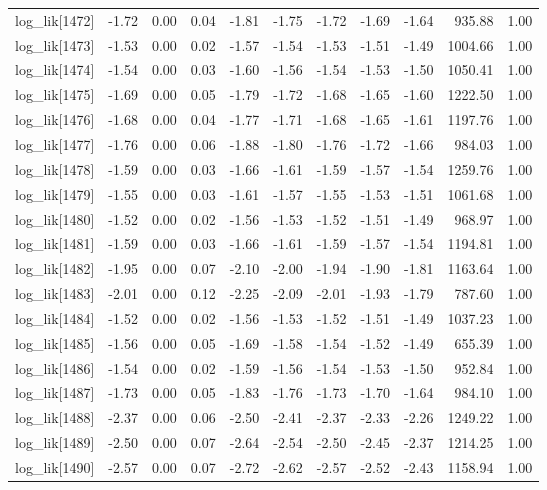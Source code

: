 \begin{table}[ht]
\begin{tabular}{rrrrrrrrrrr}
  log\_lik[1472] & -1.72 & 0.00 & 0.04 & -1.81 & -1.75 & -1.72 & -1.69 & -1.64 & 935.88 & 1.00 \\ 
  log\_lik[1473] & -1.53 & 0.00 & 0.02 & -1.57 & -1.54 & -1.53 & -1.51 & -1.49 & 1004.66 & 1.00 \\ 
  log\_lik[1474] & -1.54 & 0.00 & 0.03 & -1.60 & -1.56 & -1.54 & -1.53 & -1.50 & 1050.41 & 1.00 \\ 
  log\_lik[1475] & -1.69 & 0.00 & 0.05 & -1.79 & -1.72 & -1.68 & -1.65 & -1.60 & 1222.50 & 1.00 \\ 
  log\_lik[1476] & -1.68 & 0.00 & 0.04 & -1.77 & -1.71 & -1.68 & -1.65 & -1.61 & 1197.76 & 1.00 \\ 
  log\_lik[1477] & -1.76 & 0.00 & 0.06 & -1.88 & -1.80 & -1.76 & -1.72 & -1.66 & 984.03 & 1.00 \\ 
  log\_lik[1478] & -1.59 & 0.00 & 0.03 & -1.66 & -1.61 & -1.59 & -1.57 & -1.54 & 1259.76 & 1.00 \\ 
  log\_lik[1479] & -1.55 & 0.00 & 0.03 & -1.61 & -1.57 & -1.55 & -1.53 & -1.51 & 1061.68 & 1.00 \\ 
  log\_lik[1480] & -1.52 & 0.00 & 0.02 & -1.56 & -1.53 & -1.52 & -1.51 & -1.49 & 968.97 & 1.00 \\ 
  log\_lik[1481] & -1.59 & 0.00 & 0.03 & -1.66 & -1.61 & -1.59 & -1.57 & -1.54 & 1194.81 & 1.00 \\ 
  log\_lik[1482] & -1.95 & 0.00 & 0.07 & -2.10 & -2.00 & -1.94 & -1.90 & -1.81 & 1163.64 & 1.00 \\ 
  log\_lik[1483] & -2.01 & 0.00 & 0.12 & -2.25 & -2.09 & -2.01 & -1.93 & -1.79 & 787.60 & 1.00 \\ 
  log\_lik[1484] & -1.52 & 0.00 & 0.02 & -1.56 & -1.53 & -1.52 & -1.51 & -1.49 & 1037.23 & 1.00 \\ 
  log\_lik[1485] & -1.56 & 0.00 & 0.05 & -1.69 & -1.58 & -1.54 & -1.52 & -1.49 & 655.39 & 1.00 \\ 
  log\_lik[1486] & -1.54 & 0.00 & 0.02 & -1.59 & -1.56 & -1.54 & -1.53 & -1.50 & 952.84 & 1.00 \\ 
  log\_lik[1487] & -1.73 & 0.00 & 0.05 & -1.83 & -1.76 & -1.73 & -1.70 & -1.64 & 984.10 & 1.00 \\ 
  log\_lik[1488] & -2.37 & 0.00 & 0.06 & -2.50 & -2.41 & -2.37 & -2.33 & -2.26 & 1249.22 & 1.00 \\ 
  log\_lik[1489] & -2.50 & 0.00 & 0.07 & -2.64 & -2.54 & -2.50 & -2.45 & -2.37 & 1214.25 & 1.00 \\ 
  log\_lik[1490] & -2.57 & 0.00 & 0.07 & -2.72 & -2.62 & -2.57 & -2.52 & -2.43 & 1158.94 & 1.00 \\ 

\end{tabular}
\end{table}
